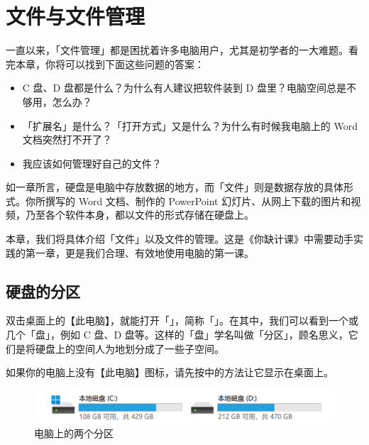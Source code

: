 \chapter{文件与文件管理}
\label{cha:files-and-file-management}

\begin{intro}
  一直以来，「文件管理」都是困扰着许多电脑用户，尤其是初学者的一大难题。看完本章，你将可以找到下面这些问题的答案：
  \begin{itemize}
    \item C 盘、D 盘都是什么？为什么有人建议把软件装到 D 盘里？电脑空间总是不够用，怎么办？
    \item 「扩展名」是什么？「打开方式」又是什么？为什么有时候我电脑上的 Word 文档突然打不开了？
    \item 我应该如何管理好自己的文件？
  \end{itemize}
\end{intro}

如一章所言，硬盘是电脑中存放数据的地方，而「文件」则是数据存放的具体形式。你所撰写的 Word 文档、制作的 PowerPoint 幻灯片、从网上下载的图片和视频，乃至各个软件本身，都以文件的形式存储在硬盘上。

本章，我们将具体介绍「文件」以及文件的管理。这是《你缺计课》中需要动手实践的第一章，更是我们合理、有效地使用电脑的第一课。

\section{硬盘的分区}

双击桌面上的【此电脑】，就能打开「」，简称「」。在其中，我们可以看到一个或几个「盘」，例如 C 盘、D 盘等。这样的「盘」学名叫做「分区」，顾名思义，它们是将硬盘上的空间人为地划分成了一些子空间。

\begin{note}
  如果你的电脑上没有【此电脑】图标，请先按中的方法让它显示在桌面上。
\end{note}

\begin{figure}[htb!]
  \centering
  \includegraphics[width=.7\textwidth]{assets/basic/Partitions.png}
  \caption{电脑上的两个分区}
  \label{fig:Partitions1-2}
\end{figure}

